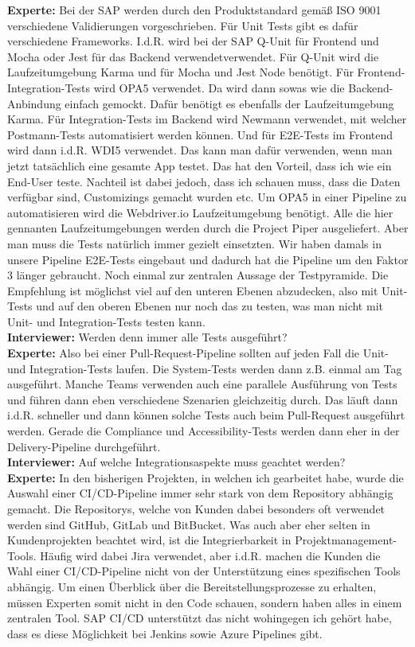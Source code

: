 \begin{linenumbers}
    \textbf{Experte:} Bei der SAP werden durch den Produktstandard gemäß ISO 9001 verschiedene Validierungen vorgeschrieben. Für Unit Tests gibt es dafür verschiedene Frameworks. I.d.R. wird bei der SAP Q-Unit für Frontend und Mocha oder Jest für das Backend verwendetverwendet. Für Q-Unit wird die Laufzeitumgebung Karma und für Mocha und Jest Node benötigt. Für Frontend-Integration-Tests wird OPA5 verwendet. Da wird dann sowas wie die Backend-Anbindung einfach gemockt. Dafür benötigt es ebenfalls der Laufzeitumgebung Karma. Für Integration-Tests im Backend wird Newmann verwendet, mit welcher Postmann-Tests automatisiert werden können. Und für E2E-Tests im Frontend wird dann i.d.R. WDI5 verwendet. Das kann man dafür verwenden, wenn man jetzt tatsächlich eine gesamte App testet. Das hat den Vorteil, dass ich wie ein End-User teste. Nachteil ist dabei jedoch, dass ich schauen muss, dass die Daten verfügbar sind, Customizings gemacht wurden etc. Um OPA5 in einer Pipeline zu automatisieren wird die Webdriver.io Laufzeitumgebung benötigt. Alle die hier gennanten Laufzeitumgebungen werden durch die Project Piper ausgeliefert. Aber man muss die Tests natürlich immer gezielt einsetzten. Wir haben damals in unsere Pipeline E2E-Tests eingebaut und dadurch hat die Pipeline um den Faktor 3 länger gebraucht. Noch einmal zur zentralen Aussage der Testpyramide. Die Empfehlung ist möglichst viel auf den unteren Ebenen abzudecken, also mit Unit-Tests und auf den oberen Ebenen nur noch das zu testen, was man nicht mit Unit- und Integration-Tests testen kann.\\
    \textbf{Interviewer:} Werden denn immer alle Tests ausgeführt?\\
    \textbf{Experte:} Also bei einer Pull-Request-Pipeline sollten auf jeden Fall die Unit- und Integration-Tests laufen. Die System-Tests werden dann z.B. einmal am Tag ausgeführt. Manche Teams verwenden auch eine parallele Ausführung von Tests und führen dann eben verschiedene Szenarien gleichzeitig durch. Das läuft dann i.d.R. schneller und dann können solche Tests auch beim Pull-Request ausgeführt werden. Gerade die Compliance und Accessibility-Tests werden dann eher in der Delivery-Pipeline durchgeführt.\\
    \textbf{Interviewer:} Auf welche Integrationsaspekte muss geachtet werden?\\
    \textbf{Experte:} In den bisherigen Projekten, in welchen ich gearbeitet habe, wurde die Auswahl einer CI/CD-Pipeline immer sehr stark von dem Repository abhängig gemacht. Die Repositorys, welche von Kunden dabei besonders oft verwendet werden sind GitHub, GitLab und BitBucket. Was auch aber eher selten in Kundenprojekten beachtet wird, ist die Integrierbarkeit in Projektmanagement-Tools. Häufig wird dabei Jira verwendet, aber i.d.R. machen die Kunden die Wahl einer CI/CD-Pipeline nicht von der Unterstützung eines spezifischen Tools abhängig. Um einen Überblick über die Bereitstellungsprozesse zu erhalten, müssen Experten somit nicht in den Code schauen, sondern haben alles in einem zentralen Tool. SAP CI/CD unterstützt das nicht wohingegen ich gehört habe, dass es diese Möglichkeit bei Jenkins sowie Azure Pipelines gibt.\\ 

\end{linenumbers}
